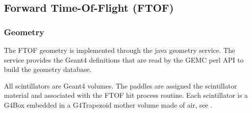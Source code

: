\subsection{Forward Time-Of-Flight (FTOF)}

\subsubsection{Geometry}

The FTOF geometry is implemented through the java geometry service.
The service provides the Geant4 definitions that are read by the GEMC perl API to build the geometry database.

All scintillators are Geant4 volumes. The paddles are assigned the scintillator material and associated with the FTOF hit process routine.
Each scintillator is a G4Box embedded in a G4Trapezoid mother volume made of air, see . 


